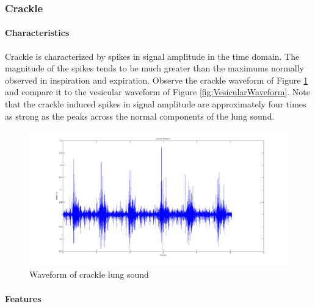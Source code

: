 \documentclass{article}
\begin{document}
\subsubsection{Crackle}

\paragraph{Characteristics}

Crackle is characterized by spikes in signal amplitude in the time domain. The magnitude of the spikes tends to be much greater than the maximums normally observed in inspiration and expiration. Observe the crackle waveform of Figure \ref{fig:CrackleWaveform} and compare it to the vesicular waveform of Figure \ref{fig:VesicularWaveform}. Note that the crackle induced spikes in signal amplitude are approximately four times as strong as the peaks across the normal components of the lung sound.\\

\begin{figure}[H]
	\includegraphics[width=\linewidth]{images/CrackleWaveform.png}
	\caption{Waveform of crackle lung sound}
 	\label{fig:CrackleWaveform}
\end{figure}

\paragraph{Features}
\end{document}
